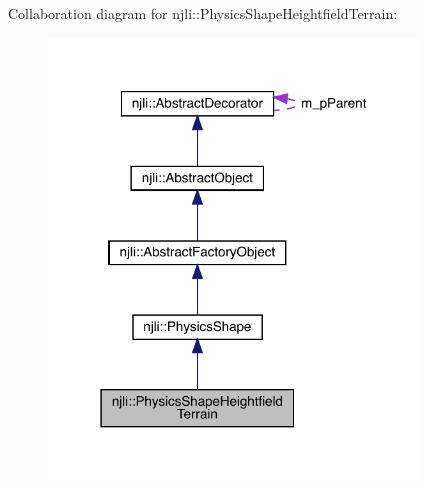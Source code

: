 Collaboration diagram for njli\+:\+:Physics\+Shape\+Heightfield\+Terrain\+:\nopagebreak
\begin{figure}[H]
\begin{center}
\leavevmode
\includegraphics[width=279pt]{classnjli_1_1_physics_shape_heightfield_terrain__coll__graph}
\end{center}
\end{figure}
